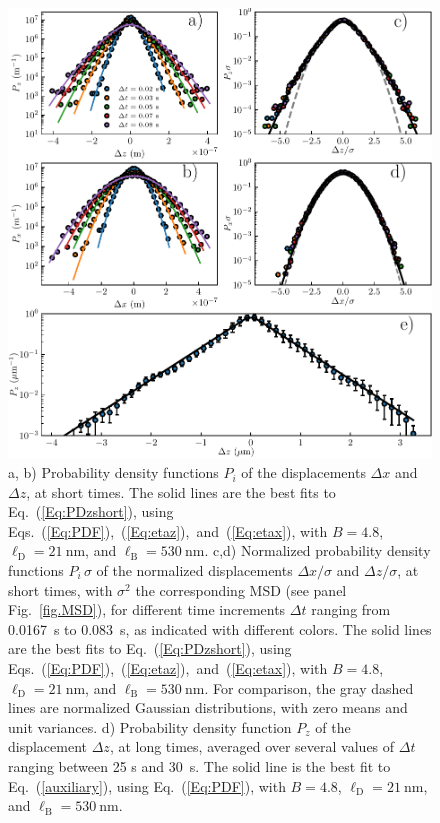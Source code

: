 \begin{figure}[H]
	\centering
	\includegraphics{02_body/chapter3/images/trajctory_analysis/P_displacement.pdf}
	\caption{a, b) Probability density functions $P_i$ of the displacements $\Delta x$ and $\Delta z$, at short times. The solid lines are the best fits to Eq.~(\ref{Eq:PDzshort}), using Eqs.~(\ref{Eq:PDF}),~(\ref{Eq:etaz}),~and~(\ref{Eq:etax}), with $B = 4.8$, $\ell_\mathrm{D} = 21 ~ \mathrm{nm}$, and $\ell_\mathrm{B} = 530~\mathrm{nm}$. c,d) Normalized probability density functions $P_i\,\sigma$ of the normalized displacements $\Delta x/\sigma$ and $\Delta z/\sigma$, at short times, with $\sigma^2$ the corresponding MSD (see panel Fig.~\ref{fig.MSD}), for different time increments $\Delta t$ ranging from 0.0167~s to 0.083~s, as indicated with different colors. The solid lines are the best fits to Eq.~(\ref{Eq:PDzshort}), using Eqs.~(\ref{Eq:PDF}),~(\ref{Eq:etaz}),~and~(\ref{Eq:etax}), with $B = 4.8$, $\ell_\mathrm{D} = 21 ~ \mathrm{nm}$, and $\ell_\mathrm{B} = 530~\mathrm{nm}$. For comparison, the gray dashed lines are normalized Gaussian distributions, with zero means and unit variances. d) Probability density function $P_z$ of the displacement $\Delta z$, at long times, averaged over several values of $\Delta t$ ranging between 25 s and 30~s. The solid line is the best fit to Eq.~(\ref{auxiliary}), using Eq.~(\ref{Eq:PDF}), with $B = 4.8$, $\ell_\mathrm{D} = 21 ~ \mathrm{nm}$, and $\ell_\mathrm{B} = 530~\mathrm{nm}$.}
	\label{fig.displacement}
\end{figure}



